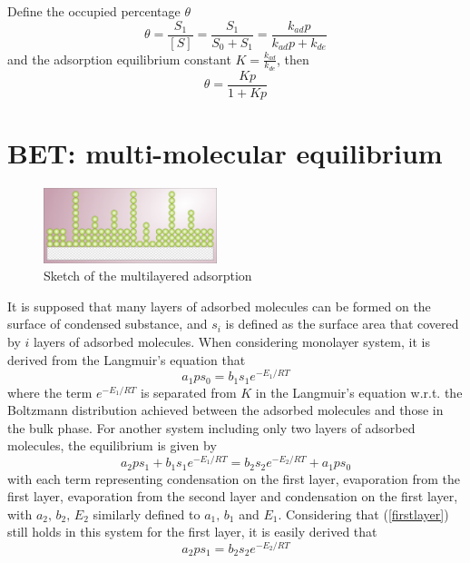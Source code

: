 \documentclass[%
 reprint,
 amsmath,amssymb,
 aps,
10.5pt,
]{revtex4-1}
\begin{document}
Define the occupied percentage $\theta$
\begin{equation}
\theta = \frac{S_1}{[S]} = \frac{S_1}{S_0+S_1} = \frac{k_{ad}p}{k_{ad}p+k_{de}}
\end{equation}
and the adsorption equilibrium constant $K=\frac{k_{ad}}{k_{de}}$, then
\begin{equation}
\theta = \frac{Kp}{1+Kp}
\end{equation}


\section{BET: multi-molecular equilibrium}
\begin{figure}
\centering
\includegraphics[width=0.45\textwidth]{figures/900px-BET_Multilayer_Adsorption.svg.png}
\caption{Sketch of the multilayered adsorption}
\end{figure}
It is supposed that many layers of adsorbed molecules can be formed on the surface of condensed substance, and $s_i$ is defined as the surface area that covered by $i$ layers of adsorbed molecules. When considering monolayer system, it is derived from the Langmuir's equation that
\begin{equation}
a_1 p s_0 = b_1 s_1 e^{-E_1/RT}
\label{firstlayer}
\end{equation}
where the term $e^{-E_1/RT}$ is separated from $K$ in the Langmuir's equation w.r.t. the Boltzmann distribution achieved between the adsorbed molecules and those in the bulk phase. For another system including only two layers of adsorbed molecules, the equilibrium is given by
\begin{equation}
a_2 p s_1 + b_1 s_1 e^{-E_1/RT} = b_2 s_2 e^{-E_2/RT} + a_1 p s_0
\end{equation}
with each term representing condensation on the first layer, evaporation from the first layer, evaporation from the second layer and condensation on the first layer, with $a_2,\, b_2,\, E_2$ similarly defined to $a_1,\, b_1$ and $E_1$. Considering that (\ref{firstlayer}) still holds in this system for the first layer, it is easily derived that
\begin{equation}
a_2 p s_1 = b_2 s_2 e^{-E_2/RT}
\end{equation}
\end{document}
